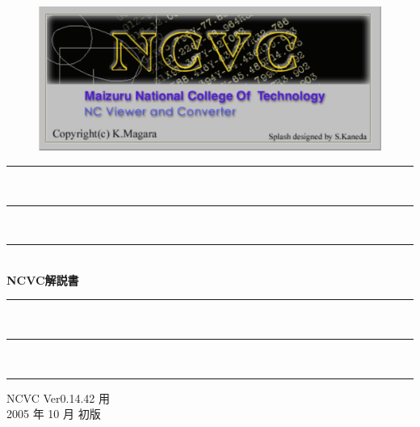 
\vspace*{4zh}
\begin{figure}[H]
\centering
\includegraphics[scale=0.8]{logo.pdf}
\end{figure}

\vspace*{3zh}
\begin{center}
    \rule{6cm}{0.2zw}\\[-0.5zh]
    \rule{5cm}{0.1zw}\\[-0.5zh]
    \rule{4cm}{0.05zw}\\[1zh]
    {\Large \textbf{NCVC解説書}}\\
    \rule{4cm}{0.05zw}\\[-0.5zh]
    \rule{5cm}{0.1zw}\\[-0.5zh]
    \rule{6cm}{0.2zw}

    \vspace*{8cm}
    NCVC Ver0.14.42 用\\
    2005 年 10 月 初版
\end{center}
